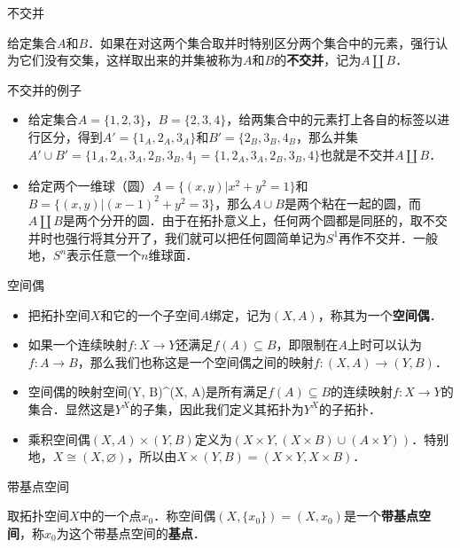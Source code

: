 
\begin{definition}{不交并}

给定集合$A$和$B$．如果在对这两个集合取并时特别区分两个集合中的元素，强行认为它们没有交集，这样取出来的并集被称为$A$和$B$的\textbf{不交并}，记为$A\amalg B$．

\end{definition}

\begin{example}{不交并的例子}
\begin{itemize}
\item 给定集合$A=\{1,2,3\}$，$B=\{2,3,4\}$，给两集合中的元素打上各自的标签以进行区分，得到$A'=\{1_A, 2_A, 3_A\}$和$B'=\{2_B, 3_B, 4_B$，那么并集$A'\cup B'=\{1_A, 2_A, 3_A, 2_B, 3_B, 4_\}=\{1, 2_A, 3_A, 2_B, 3_B, 4\}$也就是不交并$A\amalg B$．
\item 给定两个一维球（圆）$A=\{(x, y)|x^2+y^2=1\}$和$B=\{(x, y)|(x-1)^2+y^2=3\}$，那么$A\cup B$是两个粘在一起的圆，而$A\amalg B$是两个分开的圆．由于在拓扑意义上，任何两个圆都是同胚的，取不交并时也强行将其分开了，我们就可以把任何圆简单记为$S^1$再作不交并．一般地，$S^n$表示任意一个$n$维球面．

\end{itemize}
\end{example}

\begin{definition}{空间偶}
\begin{itemize}
\item 把拓扑空间$X$和它的一个子空间$A$绑定，记为$(X, A)$，称其为一个\textbf{空间偶}．
\item 如果一个连续映射$f:X\rightarrow Y$还满足$f(A)\subseteq B$，即限制在$A$上时可以认为$f:A\rightarrow B$，那么我们也称这是一个空间偶之间的映射$f:(X, A)\rightarrow(Y, B)$．
\item 空间偶的映射空间(Y, B)^{(X, A)}是所有满足$f(A)\subseteq B$的连续映射$f:X\rightarrow Y$的集合．显然这是$Y^X$的子集，因此我们定义其拓扑为$Y^X$的子拓扑．
\item 乘积空间偶$(X, A)\times(Y,B)$定义为$(X\times Y, (X\times B)\cup(A\times Y))$．特别地，$X\cong(X, \varnothing)$，所以由$X\times(Y, B)=(X\times Y, X\times B)$．


\end{itemize}
\end{definition}

\begin{definition}{带基点空间}

取拓扑空间$X$中的一个点$x_0$．称空间偶$(X, \{x_0\})=(X, x_0)$是一个\textbf{带基点空间}，称$x_0$为这个带基点空间的\textbf{基点}．

\end{definition}

